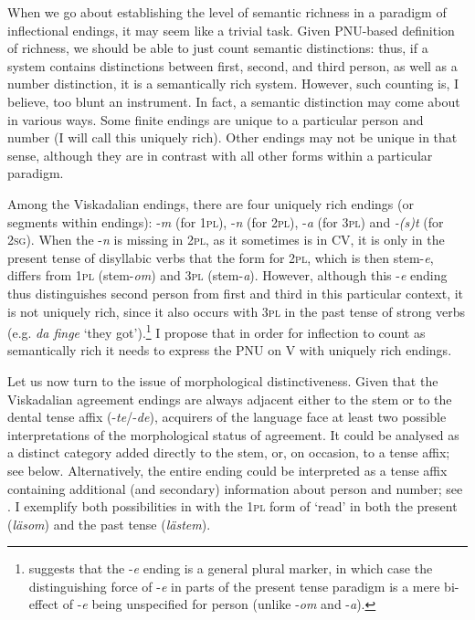 \documentclass[output=paper,colorlinks,citecolor=brown,draft,draftmode]{langscibook}
\begin{document}
When we go about establishing the level of semantic richness in a paradigm of inflectional endings, it may seem like a trivial task. Given  PNU-based definition of richness, we should be able to just count semantic distinctions: thus, if a system contains distinctions between first, second, and third person, as well as a number distinction, it is a semantically rich system. However, such counting is, I believe, too blunt an instrument. In fact, a semantic distinction may come about in various ways. Some finite endings are unique to a particular person and number (I will call this uniquely rich). Other endings may not be unique in that sense, although they are in contrast with all other forms within a particular paradigm.



Among the Viskadalian endings, there are four uniquely rich endings (or segments within endings): -\textit{m} (for 1\textsc{pl}), -\textit{n} (for 2\textsc{pl}), -\textit{a} (for 3\textsc{pl}) and \textit{-(s)t} (for 2\textsc{sg}). When the -\textit{n} is missing in 2\textsc{pl}, as it sometimes is in CV, it is only in the present tense of disyllabic verbs that the form for 2\textsc{pl}, which is then stem-\textit{e}, differs from 1\textsc{pl} (stem-\textit{om}) and 3\textsc{pl} (stem-\textit{a}). However, although this -\textit{e} ending thus distinguishes second person from first and third in this particular context, it is not uniquely rich, since it also occurs with 3\textsc{pl} in the past tense of strong verbs (e.g. \textit{da finge} ‘they got’).\footnote{\citet{Petzell2017} suggests that the -\textit{e} ending is a general plural marker, in which case the distinguishing force of \nobreakdash-\textit{e} in parts of the present tense paradigm is a mere bi-effect of -\textit{e} being unspecified for person (unlike -\textit{om} and -\textit{a}).} I propose that in order for inflection to count as semantically rich it needs to express the PNU on V with uniquely rich endings.



Let us now turn to the issue of morphological distinctiveness. Given that the Viskadalian agreement endings are always adjacent either to the stem or to the dental tense affix (-\textit{te}/-\textit{de}), acquirers of the language face at least two possible interpretations of the morphological status of agreement. It could be analysed as a distinct category added directly to the stem, or, on occasion, to a tense affix; see  below. Alternatively, the entire ending could be interpreted as a tense affix containing additional (and secondary) information about person and number; see . I exemplify both possibilities in  with the 1\textsc{pl} form of ‘read’ in both the present (\textit{läsom}) and the past tense (\textit{lästem}).
\end{document}
